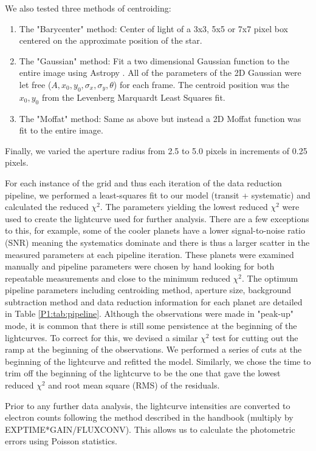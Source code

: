 We also tested three methods of centroiding:
\begin{enumerate}
    \item The "Barycenter" method: Center of light of a 3x3, 5x5 or 7x7 pixel box centered on the approximate position of the star.
    \item The "Gaussian" method: Fit a two dimensional Gaussian function to the entire image using Astropy \citep{AstropyCollaborationandPrice-Whelan2018}. All of the parameters of the 2D Gaussian were let free ($A, x_0, y_0, \sigma_x, \sigma_y,\theta$) for each frame. The centroid position was the $x_0, y_0$ from the Levenberg Marquardt Least Squares fit. \citep{Agol2010}
    \item The "Moffat" method: Same as above but instead a 2D Moffat function was fit to the entire image.
\end{enumerate}
Finally, we varied the aperture radius from 2.5 to 5.0 pixels in increments of 0.25 pixels.

For each instance of the grid and thus each iteration of the data reduction pipeline, we performed a least-squares fit to our model (transit + systematic) and calculated the reduced $\chi^2$. The parameters yielding the lowest reduced $\chi^2$ were used to create the lightcurve used for further analysis. There are a few exceptions to this, for example, some of the cooler planets have a lower signal-to-noise ratio (SNR) meaning the systematics dominate and there is thus a larger scatter in the measured parameters at each pipeline iteration. These planets were examined manually and pipeline parameters were chosen by hand looking for both repeatable measurements and close to the minimum reduced $\chi^2$. The optimum pipeline parameters including centroiding method, aperture size, background subtraction method and data reduction information for each planet are detailed in Table \ref{P1:tab:pipeline}. Although the observations were made in "peak-up" mode, it is common that there is still some persistence at the beginning of the lightcurves. To correct for this, we devised a similar $\chi^2$ test for cutting out the ramp at the beginning of the observations. We performed a series of cuts at the beginning of the lightcurve and refitted the model. Similarly, we chose the time to trim off the beginning of the lightcurve to be the one that gave the lowest reduced $\chi^2$ and root mean square (RMS) of the residuals.

Prior to any further data analysis, the lightcurve intensities are converted to electron counts following the method described in the \spitzer handbook (multiply by \\ EXPTIME*GAIN/FLUXCONV). This allows us to calculate the photometric errors using Poisson statistics.

